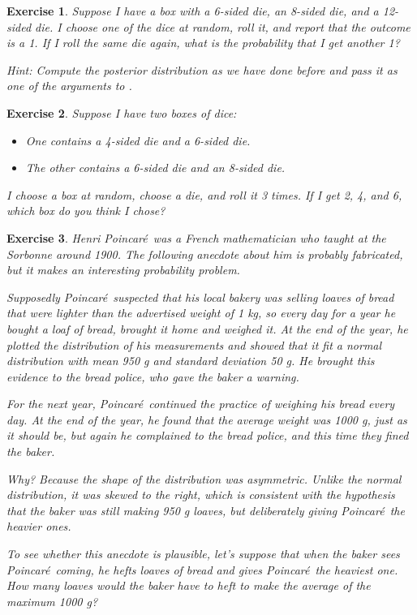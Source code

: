 \documentclass[12pt]{book}
\theoremstyle{exercise}
\newtheorem{exercise}{Exercise}[chapter]
\begin{document}
\begin{exercise}
Suppose I have a box with a 6-sided die, an 8-sided die, and a 12-sided die.
I choose one of the dice at random, roll it, and report that the outcome is a 1.
If I roll the same die again, what is the probability that I get another 1?

Hint: Compute the posterior distribution as we have done before and pass it as one of the arguments to .
\end{exercise}


\begin{exercise}
Suppose I have two boxes of dice:

\begin{itemize}
\item One contains a 4-sided die and a 6-sided die.

\item The other contains a 6-sided die and an 8-sided die.
\end{itemize}

I choose a box at random, choose a die, and roll it 3 times.  If I get 2, 4, and 6, which box do you think I chose?
\end{exercise}


\newcommand{\Poincare}{Poincar\'{e}}

\begin{exercise}
Henri \Poincare~was a French mathematician who taught at the Sorbonne around 1900. The following anecdote about him is probably fabricated, but it makes an interesting probability problem.

Supposedly \Poincare~suspected that his local bakery was selling loaves of bread that were lighter than the advertised weight of 1 kg, so every day for a year he bought a loaf of bread, brought it home and weighed it. At the end of the year, he plotted the distribution of his measurements and showed that it fit a normal distribution with mean 950 g and standard deviation 50 g. He brought this evidence to the bread police, who gave the baker a warning.

For the next year, \Poincare~continued the practice of weighing his bread every day. At the end of the year, he found that the average weight was 1000 g, just as it should be, but again he complained to the bread police, and this time they fined the baker.

Why? Because the shape of the distribution was asymmetric. Unlike the normal distribution, it was skewed to the right, which is consistent with the hypothesis that the baker was still making 950 g loaves, but deliberately giving \Poincare~the heavier ones.

To see whether this anecdote is plausible, let's suppose that when the baker sees \Poincare~coming, he hefts  loaves of bread and gives \Poincare~the heaviest one.  How many loaves would the baker have to heft to make the average of the maximum 1000 g?
\end{exercise}
\end{document}
